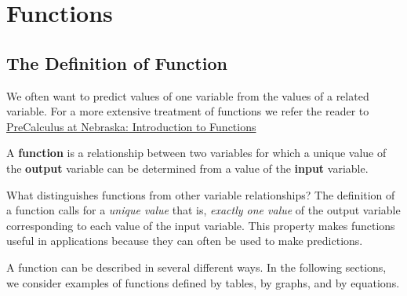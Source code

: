 \documentclass[10pt,]{book}
\newcommand{\terminology}[1]{\textbf{#1}}
\theoremstyle{plain}
\theoremstyle{definition}
\theoremstyle{definition}
\theoremstyle{definition}
\theoremstyle{definition}
\numberwithin{equation}{section}
\let\oldsection\section
\renewcommand\section{\znewpage\oldsection}
\let\oldchapter\chapter
\renewcommand\chapter{\clearpage\gdef\znewpage{\global\let\znewpage\clearpage}\oldchapter}
\begin{document}
\chapter[{Functions}]{Functions}\label{introfunctions}
\typeout{************************************************}
\typeout{************************************************}
\section[{The Definition of Function}]{The Definition of Function}\label{subsection-1}
\hypertarget{p-21}{}%
We often want to predict values of one variable from the values of a related variable. For a more extensive treatment of functions we refer the reader to \href{https://mathbooks.unl.edu/PreCalculus/introfunctions.html}{PreCalculus at Nebraska: Introduction to Functions}%
\begin{assemblage}\label{assemblage-1}
\hypertarget{p-22}{}%
A \terminology{function} is a relationship between two variables for which a unique value of the \terminology{output} variable can be determined from a value of the \terminology{input} variable.%
\end{assemblage}
\hypertarget{p-23}{}%
What distinguishes functions from other variable relationships? The definition of a function calls for a \emph{unique value} that is, \emph{exactly one value} of the output variable corresponding to each value of the input variable. This property makes functions useful in applications because they can often be used to make predictions.%
\par
\hypertarget{p-24}{}%
A function can be described in several different ways. In the following sections, we consider examples of functions defined by tables, by graphs, and by equations.%
\typeout{************************************************}
\typeout{************************************************}
\end{document}
